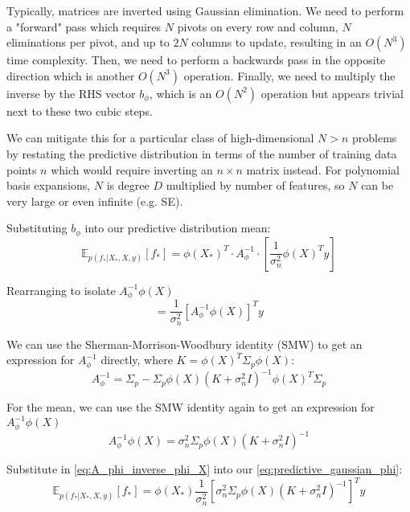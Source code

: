 Typically, matrices are inverted using Gaussian elimination. We need to perform a "forward" pass which requires $N$ pivots on every row and column, $N$ eliminations per pivot, and up to $2N$ columns to update, resulting in an $O(N^3)$ time complexity. Then, we need to perform a backwards pass in the opposite direction which is another $O(N^3)$ operation. Finally, we need to multiply the inverse by the RHS vector $b_{\phi}$, which is an $O(N^2)$ operation but appears trivial next to these two cubic steps. 

We can mitigate this for a particular class of high-dimensional $N > n$ problems by restating the predictive distribution in terms of the number of training data points $n$ which would require inverting an $n \times n$ matrix instead. For polynomial basis expansions, $N$ is degree $D$ multiplied by number of features, so $N$ can be very large or even infinite (e.g. SE). %

Substituting $b_{\phi}$ into our predictive distribution mean:
\begin{equation*}
    \mathbb{E}_{p(f_*|X_*,X,y)}[f_*] = \phi(X_*)^T \cdot A_\phi^{-1} \cdot \left[\frac{1}{\sigma_n^2}\phi(X)^Ty\right]
\end{equation*}

Rearranging to isolate $A_\phi^{-1}\phi(X)$
\begin{equation*}
    = \frac{1}{\sigma_n^2}\left[A_{\phi}^{-1}\phi(X)\right]^Ty
\end{equation*}

We can use the Sherman-Morrison-Woodbury identity (SMW) to get an expression for $A_{\phi}^{-1}$ directly, where $K =\phi(X)^T\Sigma_p\phi(X)$:
\begin{equation*}
    A_{\phi}^{-1} = \Sigma_p - \Sigma_p\phi(X)(K+\sigma_n^2I)^{-1}\phi(X)^T\Sigma_p
\end{equation*}

For the mean, we can use the SMW identity again to get an expression for $A_{\phi}^{-1}\phi(X)$
\begin{equation} \label{eq:A_phi_inverse_phi_X}
    A_{\phi}^{-1}\phi(X) = \sigma_n^2\Sigma_p\phi(X)(K+\sigma_n^2I)^{-1}
\end{equation}

Substitute in \ref{eq:A_phi_inverse_phi_X} into our \ref{eq:predictive_gaussian_phi}:
\begin{equation*}
    \mathbb{E}_{p(f_*|X_*,X,y)}[f_*] = \phi(X_*) \frac{1}{\sigma_n^2}\left[\sigma_n^2\Sigma_p\phi(X)(K+\sigma_n^2I)^{-1}\right]^Ty
\end{equation*}

